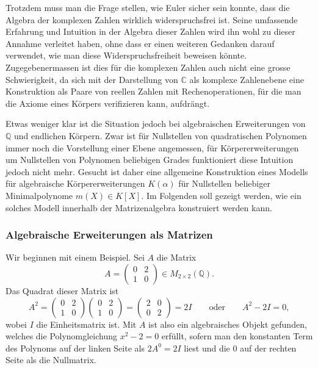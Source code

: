 Trotzdem muss man die Frage stellen, wie Euler sicher sein konnte,
dass die Algebra der komplexen Zahlen wirklich widerspruchsfrei ist.
Seine umfassende Erfahrung und Intuition in der Algebra dieser Zahlen
wird ihn wohl zu dieser Annahme verleitet haben, ohne dass er einen
weiteren Gedanken darauf verwendet, wie man diese Widerspruchsfreiheit
beweisen könnte.
Zugegebenermassen ist dies für die komplexen Zahlen auch nicht eine
grosse Schwierigkeit, da sich mit der Darstellung von $\mathbb{C}$
als komplexe Zahlenebene eine Konstruktion als Paare von reellen
Zahlen mit Rechenoperationen, für die man die Axiome eines Körpers
verifizieren kann, aufdrängt.

Etwas weniger klar ist die Situation jedoch bei algebraischen
Erweiterungen von $\mathbb{Q}$ und endlichen Körpern.
Zwar ist für Nullstellen von quadratischen Polynomen
immer noch die Vorstellung einer Ebene angemessen, für Körpererweiterungen
um Nullstellen von Polynomen beliebigen Grades funktioniert diese
Intuition jedoch nicht mehr.
Gesucht ist daher eine allgemeine Konstruktion eines Modells für 
algebraische Körpererweiterungen $K(\alpha)$ für Nullstellen beliebiger
Minimalpolynome $m(X)\in K[X]$.
Im Folgenden soll gezeigt werden, wie ein solches Modell innerhalb
der Matrizenalgebra konstruiert werden kann.

\subsubsection{Algebraische Erweiterungen als Matrizen}
Wir beginnen mit einem Beispiel.
Sei $A$ die Matrix
\begin{equation}
A 
=
\begin{pmatrix}
0&2\\
1&0
\end{pmatrix}
\in
M_{2\times 2}(\mathbb{Q}).
\label{buch:komplex:zahlen:eqn:Awurzel2}
\end{equation}
Das Quadrat dieser Matrix ist
\[
A^2
=
\begin{pmatrix}
0&2\\
1&0
\end{pmatrix}
\begin{pmatrix}
0&2\\
1&0
\end{pmatrix}
=
\begin{pmatrix}
2&0\\
0&2
\end{pmatrix}
=
2I
\qquad\text{oder}\qquad
A^2-2I = 0,
\]
wobei $I$ die Einheitsmatrix ist.
Mit $A$ ist also ein algebraisches Objekt gefunden, welches die
Polynomgleichung $x^2-2=0$ erfüllt, sofern man den konstanten
Term des Polynoms auf der linken Seite als $2A^0=2I$ liest und 
die 0 auf der rechten Seite als die Nullmatrix.

